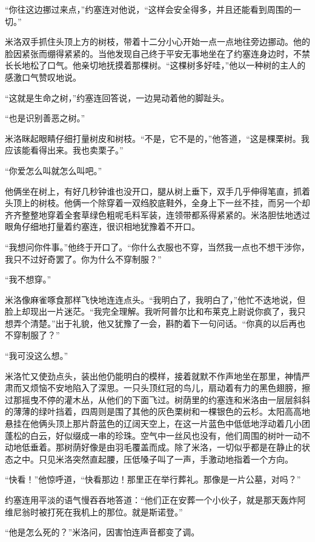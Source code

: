     “你往这边挪过来点，”约塞连对他说，“这样会安全得多，并且还能看到周围的一切。”

    米洛双手抓住头顶上方的树枝，带着十二分小心开始一点一点地往旁边挪动。他的脸因紧张而绷得紧紧的。当他发现自己终于平安无事地坐在了约塞连身边时，不禁长长地松了口气。他亲切地抚摸着那棵树。“这棵树多好哇，”他以一种树的主人的感激口气赞叹地说。

    “这就是生命之树，”约塞连回答说，一边晃动着他的脚趾头。

    “也是识别善恶之树。”

    米洛眯起眼睛仔细打量树皮和树枝。“不是，它不是的，”他答道，“这是棵栗树。我应该能看得出来。我也卖栗子。”

    “你爱怎么叫就怎么叫吧。”

    他俩坐在树上，有好几秒钟谁也没开口，腿从树上垂下，双手几乎伸得笔直，抓着头顶上的树枝。他俩一个除穿着一双绉胶底鞋外，全身上下一丝不挂，而另一个却齐齐整整地穿着全套草绿色粗呢毛料军装，连领带都系得紧紧的。米洛胆怯地透过眼角仔细地打量着约塞连，很识相地犹豫着不开口。

    “我想问你件事。”他终于开口了。“你什么衣服也不穿，当然我一点也不想干涉你，我只不过好奇罢了。你为什么不穿制服？”

    “我不想穿。”

    米洛像麻雀啄食那样飞快地连连点头。“我明白了，我明白了，”他忙不迭地说，但脸上却现出一片迷茫。“我完全理解。我听阿普尔比和布莱克上尉说你疯了，我只想弄个清楚。”出于礼貌，他又犹豫了一会，斟酌着下一句问话。“你真的以后再也不穿制服了？”

    “我可没这么想。”

    米洛忙又使劲点头，装出他仍能明白的模样，接着就默不作声地坐在那里，神情严肃而又烦恼不安地陷入了深思。一只头顶红冠的鸟儿，扇动着有力的黑色翅膀，擦过那摇曳不停的灌木丛，从他们的下面飞过。树荫里的约塞连和米洛由一层层斜斜的薄薄的绿叶挡着，四周则是围了其他的灰色栗树和一棵银色的云杉。太阳高高地悬挂在他俩头顶上那片蔚蓝色的辽阔天空上，在这一片蓝色中低低地浮动着几小团蓬松的白云，好似缀成一串的珍珠。空气中一丝风也没有，他们周围的树叶一动不动地低垂着。那树荫好像是由羽毛覆盖而成。除了米洛，一切似乎都是在静止的状态之中。只见米洛突然直起腰，压低嗓子叫了一声，手激动地指着一个方向。

    “快看！”他惊呼道，“快看那边！那里正在举行葬礼。那像是一片公墓，对吗？”

    约塞连用平淡的语气慢吞吞地答道：“他们正在安葬一个小伙子，就是那天轰炸阿维尼翁时被打死在我机上的那位。就是斯诺登。”

    “他是怎么死的？”米洛问，因害怕连声音都变了调。

